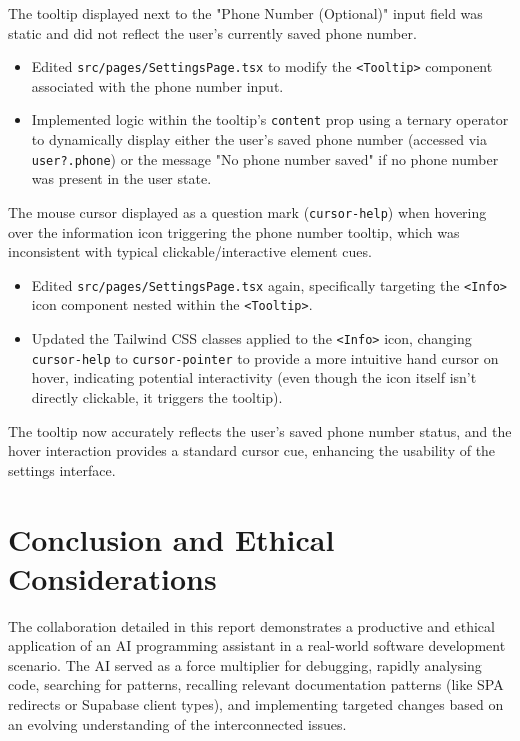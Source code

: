 \documentclass[11pt]{article} %
\begin{document}
\begin{description}[style=unboxed,leftmargin=0pt]
    \item[Problem 1:] The tooltip displayed next to the "Phone Number (Optional)" input field was static and did not reflect the user's currently saved phone number.
    \item[AI Assistance (Implementation):]
        \begin{itemize}
            \item Edited \texttt{src/pages/SettingsPage.tsx} to modify the \texttt{<Tooltip>} component associated with the phone number input.
            \item Implemented logic within the tooltip's \texttt{content} prop using a ternary operator to dynamically display either the user's saved phone number (accessed via \texttt{user?.phone}) or the message "No phone number saved" if no phone number was present in the user state.
        \end{itemize}
    \item[Problem 2:] The mouse cursor displayed as a question mark (\texttt{cursor-help}) when hovering over the information icon triggering the phone number tooltip, which was inconsistent with typical clickable/interactive element cues.
    \item[AI Assistance (Refinement):]
        \begin{itemize}
            \item Edited \texttt{src/pages/SettingsPage.tsx} again, specifically targeting the \texttt{<Info>} icon component nested within the \texttt{<Tooltip>}.
            \item Updated the Tailwind CSS classes applied to the \texttt{<Info>} icon, changing \texttt{cursor-help} to \texttt{cursor-pointer} to provide a more intuitive hand cursor on hover, indicating potential interactivity (even though the icon itself isn't directly clickable, it triggers the tooltip).
        \end{itemize}
    \item[Outcome:] The tooltip now accurately reflects the user's saved phone number status, and the hover interaction provides a standard cursor cue, enhancing the usability of the settings interface.
\end{description}

\section{Conclusion and Ethical Considerations}
The collaboration detailed in this report demonstrates a productive and ethical application of an AI programming assistant in a real-world software development scenario. The AI served as a force multiplier for debugging, rapidly analysing code, searching for patterns, recalling relevant documentation patterns (like SPA redirects or Supabase client types), and implementing targeted changes based on an evolving understanding of the interconnected issues.
\end{document}

